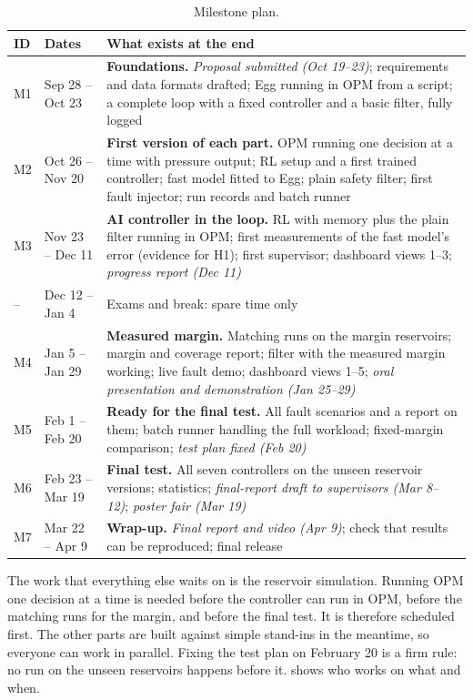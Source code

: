 \documentclass[11pt,letterpaper]{article}
\begin{document}
\begin{table}[!htbp]
\caption{Milestone plan.}\label{tab:ms}
\small
\begin{tabularx}{\textwidth}{@{}lP{2.5cm}L@{}}
\toprule
\textbf{ID} & \textbf{Dates} & \textbf{What exists at the end}\\
\midrule
M1 & Sep 28 -- Oct 23 & \textbf{Foundations.} \emph{Proposal submitted (Oct 19--23)}; requirements and data formats drafted; Egg running in OPM from a script; a complete loop with a fixed controller and a basic filter, fully logged\\
M2 & Oct 26 -- Nov 20 & \textbf{First version of each part.} OPM running one decision at a time with pressure output; RL setup and a first trained controller; fast model fitted to Egg; plain safety filter; first fault injector; run records and batch runner\\
M3 & Nov 23 -- Dec 11 & \textbf{AI controller in the loop.} RL with memory plus the plain filter running in OPM; first measurements of the fast model's error (evidence for H1); first supervisor; dashboard views 1--3; \emph{progress report (Dec 11)}\\
-- & Dec 12 -- Jan 4 & Exams and break: spare time only\\
M4 & Jan 5 -- Jan 29 & \textbf{Measured margin.} Matching runs on the margin reservoirs; margin and coverage report; filter with the measured margin working; live fault demo; dashboard views 1--5; \emph{oral presentation and demonstration (Jan 25--29)}\\
M5 & Feb 1 -- Feb 20 & \textbf{Ready for the final test.} All fault scenarios and a report on them; batch runner handling the full workload; fixed-margin comparison; \emph{test plan fixed (Feb 20)}\\
M6 & Feb 23 -- Mar 19 & \textbf{Final test.} All seven controllers on the unseen reservoir versions; statistics; \emph{final-report draft to supervisors (Mar 8--12)}; \emph{poster fair (Mar 19)}\\
M7 & Mar 22 -- Apr 9 & \textbf{Wrap-up.} \emph{Final report and video (Apr 9)}; check that results can be reproduced; final release\\
\bottomrule
\end{tabularx}
\end{table}

The work that everything else waits on is the reservoir simulation. Running OPM one
decision at a time is needed before the controller can run in OPM, before the matching
runs for the margin, and before the final test. It is therefore scheduled first. The
other parts are built against simple stand-ins in the meantime, so everyone can work in
parallel. Fixing the test plan on February 20 is a firm rule: no run on the unseen
reservoirs happens before it.  shows who works on what and when.
\end{document}
